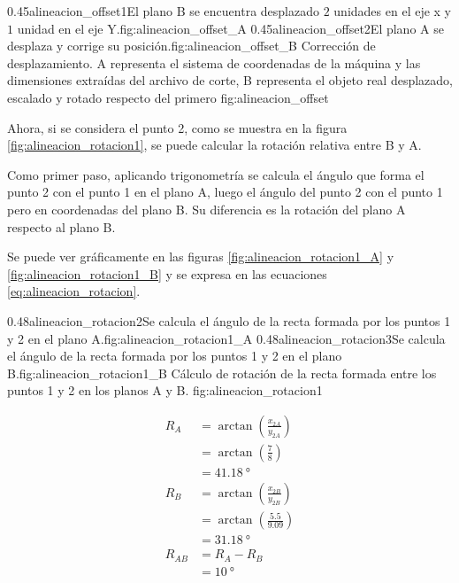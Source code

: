 \subfigab
         {0.45}{alineacion_offset1}{El plano B se encuentra desplazado $2$ unidades en el eje x y $1$ unidad en el eje Y.}{fig:alineacion_offset_A}
         {0.45}{alineacion_offset2}{El plano A se desplaza y corrige su posición.}{fig:alineacion_offset_B}
         {Corrección de desplazamiento. A representa el sistema de coordenadas de la máquina y las dimensiones extraídas del archivo de corte, B representa el objeto real desplazado, escalado y rotado respecto del primero}
         {fig:alineacion_offset}

         Ahora, si se considera el punto 2, como se muestra en la figura \ref{fig:alineacion_rotacion1}, se puede calcular la rotación relativa entre B y A.\par
         Como primer paso, aplicando trigonometría se calcula el ángulo que forma el punto 2 con el punto 1 en el plano A, luego el ángulo del punto 2 con el punto 1 pero en coordenadas del plano B.
         Su diferencia es la rotación del plano A respecto al plano B.\par
         Se puede ver gráficamente en las figuras \ref{fig:alineacion_rotacion1_A} y \ref{fig:alineacion_rotacion1_B} y se expresa en las ecuaciones \ref{eq:alineacion_rotacion}.

\subfigab
            {0.48}{alineacion_rotacion2}{Se calcula el ángulo de la recta formada por los puntos 1 y 2 en el plano A.}{fig:alineacion_rotacion1_A}
            {0.48}{alineacion_rotacion3}{Se calcula el ángulo de la recta formada por los puntos 1 y 2 en el plano B.}{fig:alineacion_rotacion1_B}
            {Cálculo de rotación de la recta formada entre los puntos 1 y 2 en los planos A y B.}
            {fig:alineacion_rotacion1}

   \begin{equation}
      \begin{aligned}
         R_A &= \arctan(\frac{x_{2A}}{y_{2A}}) \\
         &= \arctan(\frac{7}{8}) \\
         &= \SI{41.18}{\degree}\\
         R_B &= \arctan(\frac{x_{2B}}{y_{2B}})\\
         &= \arctan(\frac{5.5}{9.09}) \\
         &= \SI{31.18}{\degree}\\
         R_{AB} &= R_A - R_B\\
         &= \SI{10}{\degree}
      \end{aligned}
      \label{eq:alineacion_rotacion}
   \end{equation}

